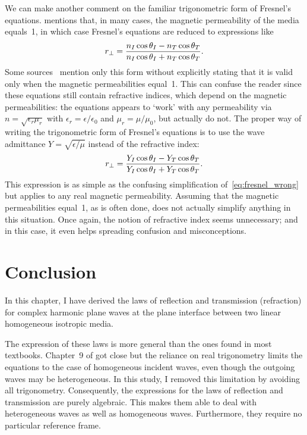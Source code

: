 We can make another comment on the familiar trigonometric form of Fresnel's equations.
\citeauthor{hecht2002optics} mentions that, in many cases, the magnetic permeability of the media equals~1, in which case Fresnel's equations are reduced to expressions like
\begin{equation}
    r_\perp
    =
    \frac{
        n_I \cos \theta_I
        -
        n_T \cos \theta_T
    }{
        n_I \cos \theta_I
        +
        n_T \cos \theta_T
    }
    \label{eq:fresnel_wrong}
    \text{.}
\end{equation}
Some sources~\parencite[for instance][]{wiki:fresnel} mention only this form without explicitly stating that it is valid only when the magnetic permeabilities equal~1.
This can confuse the reader since these equations still contain refractive indices, which depend on the magnetic permeabilities: the equations appears to `work' with any permeability via $n=\sqrt{\epsilon_r \mu_r}$ with $\epsilon_r = \epsilon / \epsilon_0$ and $\mu_r = \mu / \mu_0$, but actually do not.
The proper way of writing the trigonometric form of Fresnel's equations is to use the wave admittance $Y=\sqrt{\epsilon/\mu}$ instead of the refractive index:
\begin{equation}
    r_\perp
    =
    \frac{
        Y_I \cos \theta_I
        -
        Y_T \cos \theta_T
    }{
        Y_I \cos \theta_I
        +
        Y_T \cos \theta_T
    }
    \text{.}
\end{equation}
This expression is as simple as the confusing simplification of~\cref{eq:fresnel_wrong} but applies to any real magnetic permeability.
Assuming that the magnetic permeabilities equal~1, as is often done, does not actually simplify anything in this situation.
Once again, the notion of refractive index seems unnecessary; and in this case, it even helps spreading confusion and misconceptions.





\FloatBarrier
\section{Conclusion}
In this chapter, I have derived the laws of reflection and transmission (refraction) for complex harmonic plane waves at the plane interface between two linear homogeneous isotropic media.

The expression of these laws is more general than the ones found in most textbooks.
Chapter~9 of \textcite{stratton1941electromagnetic} got close but the reliance on real trigonometry limits the equations to the case of homogeneous incident waves, even though the outgoing waves may be heterogeneous.
In this study, I removed this limitation by avoiding all trigonometry.
Consequently, the expressions for the laws of reflection and transmission are purely algebraic.
This makes them able to deal with heterogeneous waves as well as homogeneous waves.
Furthermore, they require no particular reference frame.

